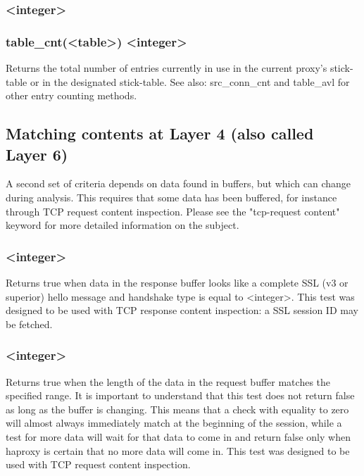 \subsubsection[table\_cnt]{ <integer>}
\subsubsection*{table\_cnt(<table>) <integer>}

Returns the total number of entries currently in use in the current proxy's
stick-table or in the designated stick-table. See also: src\_conn\_cnt and
table\_avl for other entry counting methods.

\subsection{Matching contents at Layer 4 (also called Layer 6)}
\label{sec:matching_layer4}

A second set of criteria depends on data found in buffers, but which can change
during analysis. This requires that some data has been buffered, for instance
through TCP request content inspection. Please see the "tcp-request content"
keyword for more detailed information on the subject.

\subsubsection[rep\_ssl\_hello\_type]{ <integer>}

  Returns true when data in the response buffer looks like a complete SSL (v3
  or superior) hello message and handshake type is equal to <integer>.
  This test was designed to be used with TCP response content inspection: a
  SSL session ID may be fetched.

\subsubsection[req\_len]{ <integer>}

  Returns true when the length of the data in the request buffer matches the
  specified range. It is important to understand that this test does not
  return false as long as the buffer is changing. This means that a check with
  equality to zero will almost always immediately match at the beginning of the
  session, while a test for more data will wait for that data to come in and
  return false only when haproxy is certain that no more data will come in.
  This test was designed to be used with TCP request content inspection.

